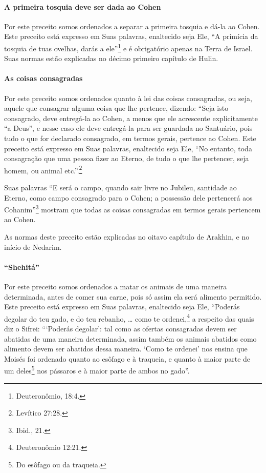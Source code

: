 \paragraph{A primeira tosquia deve ser dada ao Cohen}

Por este preceito somos ordenados a separar a primeira tosquia e dá-la
ao Cohen. Este preceito está expresso em Suas palavras, enaltecido
seja Ele, ``A primícia da tosquia de tuas ovelhas, darás a ele''\footnote{Deuteronômio, 18:4.} e é obrigatório apenas na Terra de Israel. Suas
normas estão explicadas no décimo primeiro capítulo de Hulin.

\paragraph{As coisas consagradas}

Por este preceito somos ordenados quanto à lei das coisas consagradas,
ou seja, aquele que consagrar alguma coisa que lhe pertence, dizendo:
``Seja isto consagrado, deve entregá-la ao Cohen, a menos que ele
acrescente explicitamente ``a Deus'', e nesse caso ele deve entregá-la
para ser guardada no Santuário, pois tudo o que for declarado
consagrado, em termos gerais, pertence ao Cohen. Este preceito está
expresso em Suas palavras, enaltecido seja Ele, ``No entanto, toda
consagração que uma pessoa fizer ao Eterno, de tudo o que lhe pertencer,
seja homem, ou animal etc.''.\footnote{Levítico 27:28.}

Suas palavras ``E será o campo, quando sair livre no Jubileu, santidade
ao Eterno, como campo consagrado para o Cohen; a possessão dele
pertencerá aos Cohanim''\footnote{Ibid., 21.} mostram que todas as coisas
consagradas em termos gerais pertencem ao Cohen.

As normas deste preceito estão explicadas no oitavo capítulo de
Arakhin, e no início de Nedarim.

\paragraph{``Shehitá''}

Por este preceito somos ordenados a matar os animais de uma maneira
determinada, antes de comer sua carne, pois só assim ela será alimento
permitido. Este preceito está expresso em Suas palavras, enaltecido seja
Ele, ``Poderás degolar do teu gado, e do teu rebanho, \ldots{} como te
ordenei,\footnote{Deuteronômio 12:21.} a respeito das quais diz o Sifrei:
```Poderás degolar': tal como as ofertas consagradas devem ser abatidas
de uma maneira determinada, assim também os animais abatidos como
alimento devem ser abatidos dessa maneira. `Como te ordenei' nos ensina
que Moisés foi ordenado quanto ao esôfago e à traqueia, e quanto à maior
parte de um deles\footnote{Do esôfago ou da traqueia.} nos pássaros e à maior parte de
ambos no gado''.

